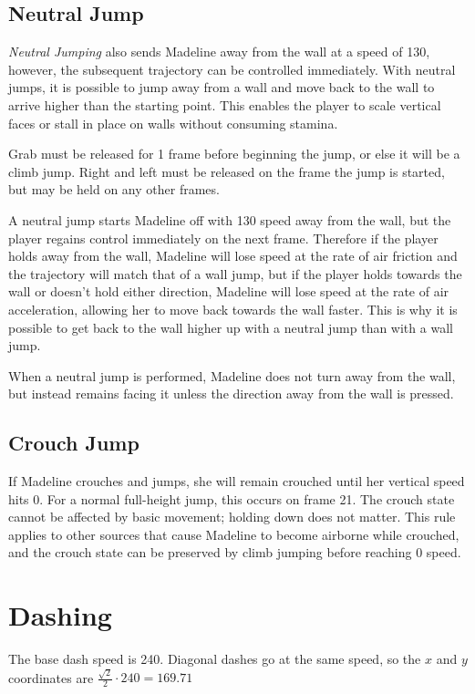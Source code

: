 \documentclass[oneside]{book}
\begin{document}
\subsection{Neutral Jump}

\textit{Neutral Jumping} also sends Madeline away from the wall at a speed of 130, however, the subsequent trajectory can be controlled immediately. With neutral jumps, it is possible to jump away from a wall and move back to the wall to arrive higher than the starting point. This enables the player to scale vertical faces or stall in place on walls without consuming stamina.

Grab must be released for 1 frame before beginning the jump, or else it will be a climb jump. Right and left must be released on the frame the jump is started, but may be held on any other frames.

A neutral jump starts Madeline off with 130 speed away from the wall, but the player regains control immediately on the next frame. Therefore if the player holds away from the wall, Madeline will lose speed at the rate of air friction and the trajectory will match that of a wall jump, but if the player holds towards the wall or doesn't hold either direction, Madeline will lose speed at the rate of air acceleration, allowing her to move back towards the wall faster. This is why it is possible to get back to the wall higher up with a neutral jump than with a wall jump.

When a neutral jump is performed, Madeline does not turn away from the wall, but instead remains facing it unless the direction away from the wall is pressed.

\subsection{Crouch Jump}

If Madeline crouches and jumps, she will remain crouched until her vertical speed hits 0. For a normal full-height jump, this occurs on frame 21. The crouch state cannot be affected by basic movement; holding down does not matter. This rule applies to other sources that cause Madeline to become airborne while crouched, and the crouch state can be preserved by climb jumping before reaching 0 speed.

\section{Dashing}

The base dash speed is 240. Diagonal dashes go at the same speed, so the $x$ and $y$ coordinates are $\frac{\sqrt{2}}{2}\cdot 240=169.71$
\end{document}
